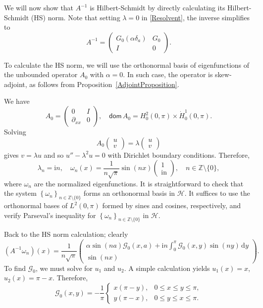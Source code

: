 \documentclass[11pt, a4paper,reqno]{amsart}
\theoremstyle{plain}
\theoremstyle{definition}
\theoremstyle{remark}
\newcommand{\dd}{\,\textrm{d}}
\renewcommand{\leq}{\leqslant}	\renewcommand{\geq}{\geqslant}
\newcommand{\1}{\mathds 1}
\newcommand{\Dom}{\mathsf{dom}\,}
\begin{document}
We will now show that $A^{-1}$ is Hilbert-Schmidt by directly calculating its Hilbert-Schmidt (HS) norm. Note that setting $\lambda = 0$ in \eqref{Resolvent}, the inverse simplifies to
\[
A^{-1} = \begin{pmatrix}
    G_0(\alpha\delta_a) & G_0 \\ I & 0
\end{pmatrix}.
\]

To calculate the HS norm, we will use the orthonormal basis of eigenfunctions of the unbounded operator $A_0$ with $\alpha = 0$. In such case, the operator is skew-adjoint, as follows from Proposition~\ref{AdjointProposition}.

We have
\[
A_0 = \begin{pmatrix}
    0 & I \\  \partial_{xx} & 0
\end{pmatrix},\quad \Dom A_0 = H_0^2(0, \pi) \times \dot H_0^1(0, \pi).
\]
Solving 
\[
A_0\begin{pmatrix}
    u \\ v
\end{pmatrix} = \lambda \begin{pmatrix}
    u \\ v
\end{pmatrix}
\]
gives $v = \lambda u$ and so $u'' - \lambda^2 u = 0$ with Dirichlet boundary conditions. 
Therefore,
\[
\lambda_n = \mathrm{i}n, \quad
\omega_n(x) = \frac{1}{n\sqrt{\pi}}\sin(nx)\begin{pmatrix}
    1 \\ \mathrm{in}
\end{pmatrix}, \quad n \in \mathbb Z \setminus \{0\},
\]
where $\omega_n$ are the normalized eigenfunctions. It is straightforward to check that the system $\left\{\omega_n\right\}_{n\in\mathbb Z \setminus \{0\}}$ forms an orthonormal basis in $\mathcal H$. It suffices to use the orthonormal bases of $L^2(0,\pi)$ formed by sines and cosines, respectively, and verify Parseval's inequality for $\left\{\omega_n\right\}_{n\in\mathbb Z \setminus \{0\}}$ in $\mathcal H$.

Back to the HS norm calculation; clearly
\[
(A^{-1}\omega_n)(x) = \frac{1}{n\sqrt{\pi}}\begin{pmatrix}
    \alpha \sin(na) \mathcal G_0(x, a) + \mathrm{i}n \int_0^\pi \mathcal G_0(x,y) \sin(ny) \dd y \\
    \sin(nx)
\end{pmatrix}.
\]
To find $\mathcal G_0$, we must solve for $u_1$ and $u_2$. A simple calculation yields $u_1(x) = x$, $u_2(x) = \pi -x$. Therefore,
\[
\mathcal G_0(x,y) = -\frac{1}{\pi}\begin{cases}
    x(\pi-y), & 0 \leq x \leq y \leq \pi, \\
    y(\pi-x), & 0 \leq y \leq x \leq \pi.
\end{cases}
\]
\end{document}
